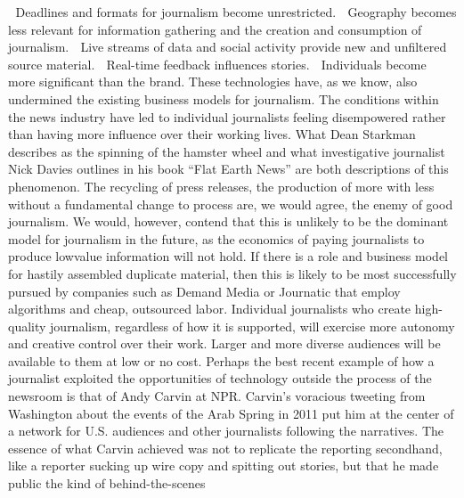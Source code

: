  Deadlines and formats for journalism become unrestricted.
 Geography becomes less relevant for information gathering and the
creation and consumption of journalism.
 Live streams of data and social activity provide new and unfiltered
source material.
 Real-time feedback influences stories.
 Individuals become more significant than the brand.
These technologies have, as we know, also undermined the existing business
models for journalism. The conditions within the news industry have led to
individual journalists feeling disempowered rather than having more influence
over their working lives. What Dean Starkman describes as the spinning of the
hamster wheel and what investigative journalist Nick Davies outlines in his book
``Flat Earth News'' are both descriptions of this phenomenon.
The recycling of press releases, the production of more with less without a fundamental
change to process are, we would agree, the enemy of good journalism.
We would, however, contend that this is unlikely to be the dominant model for
journalism in the future, as the economics of paying journalists to produce lowvalue
information will not hold. If there is a role and business model for hastily
assembled duplicate material, then this is likely to be most successfully pursued
by companies such as Demand Media or Journatic that employ algorithms and
cheap, outsourced labor.
Individual journalists who create high-quality journalism, regardless of how it
is supported, will exercise more autonomy and creative control over their work.
Larger and more diverse audiences will be available to them at low or no cost.
Perhaps the best recent example of how a journalist exploited the opportunities
of technology outside the process of the newsroom is that of Andy Carvin at
NPR. Carvin’s voracious tweeting from Washington about the events of the Arab
Spring in 2011 put him at the center of a network for U.S. audiences and other
journalists following the narratives. The essence of what Carvin achieved was
not to replicate the reporting secondhand, like a reporter sucking up wire copy
and spitting out stories, but that he made public the kind of behind-the-scenes

